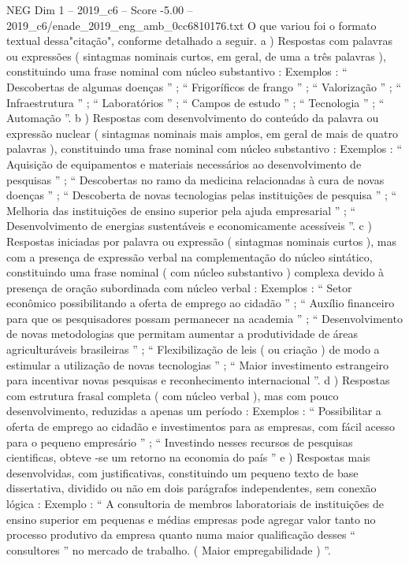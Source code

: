 \begin{textsample}{NEG Dim 1 – 2019\_c6 – Score -5.00 – 2019\_c6/enade\_2019\_eng\_amb\_0cc6810176.txt}
O que variou foi o formato textual dessa"citação", conforme detalhado a seguir. a ) Respostas com palavras ou expressões ( sintagmas nominais curtos, em geral, de uma a três palavras ), constituindo uma frase nominal com núcleo substantivo : Exemplos : “ Descobertas de algumas doenças ” ; “ Frigoríficos de frango ” ; “ Valorização ” ; “ Infraestrutura ” ; “ Laboratórios ” ; “ Campos de estudo ” ; “ Tecnologia ” ; “ Automação ”. b ) Respostas com desenvolvimento do conteúdo da palavra ou expressão nuclear ( sintagmas nominais mais amplos, em geral de mais de quatro palavras ), constituindo uma frase nominal com núcleo substantivo : Exemplos : “ Aquisição de equipamentos e materiais necessários ao desenvolvimento de pesquisas ” ; “ Descobertas no ramo da medicina relacionadas à cura de novas doenças ” ; “ Descoberta de novas tecnologias pelas instituições de pesquisa ” ; “ Melhoria das instituições de ensino superior pela ajuda empresarial ” ; “ Desenvolvimento de energias sustentáveis e economicamente acessíveis ”. c ) Respostas iniciadas por palavra ou expressão ( sintagmas nominais curtos ), mas com a presença de expressão verbal na complementação do núcleo sintático, constituindo uma frase nominal ( com núcleo substantivo ) complexa devido à presença de oração subordinada com núcleo verbal : Exemplos : “ Setor econômico possibilitando a oferta de emprego ao cidadão ” ; “ Auxílio financeiro para que os pesquisadores possam permanecer na academia ” ; “ Desenvolvimento de novas metodologias que permitam aumentar a produtividade de áreas agriculturáveis brasileiras ” ; “ Flexibilização de leis ( ou criação ) de modo a estimular a utilização de novas tecnologias ” ; “ Maior investimento estrangeiro para incentivar novas pesquisas e reconhecimento internacional ”. d ) Respostas com estrutura frasal completa ( com núcleo verbal ), mas com pouco desenvolvimento, reduzidas a apenas um período : Exemplos : “ Possibilitar a oferta de emprego ao cidadão e investimentos para as empresas, com fácil acesso para o pequeno empresário ” ; “ Investindo nesses recursos de pesquisas cientificas, obteve -se um retorno na economia do país ” e ) Respostas mais desenvolvidas, com justificativas, constituindo um pequeno texto de base dissertativa, dividido ou não em dois parágrafos independentes, sem conexão lógica : Exemplo : “ A consultoria de membros laboratoriais de instituições de ensino superior em pequenas e médias empresas pode agregar valor tanto no processo produtivo da empresa quanto numa maior qualificação desses “ consultores ” no mercado de trabalho. ( Maior empregabilidade ) ”.

\end{textsample}
